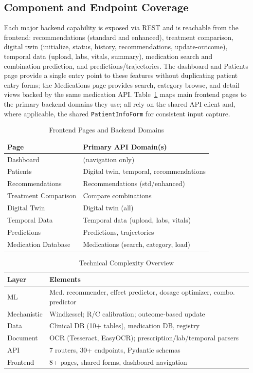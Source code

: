\documentclass[conference]{IEEEtran}
\begin{document}
\subsection{Component and Endpoint Coverage}
Each major backend capability is exposed via REST and is reachable from the frontend: recommendations (standard and enhanced), treatment comparison, digital twin (initialize, status, history, recommendations, update-outcome), temporal data (upload, labs, vitals, summary), medication search and combination prediction, and predictions/trajectories. The dashboard and Patients page provide a single entry point to these features without duplicating patient entry forms; the Medications page provides search, category browse, and detail views backed by the same medication API. Table~\ref{tab:frontend} maps main frontend pages to the primary backend domains they use; all rely on the shared API client and, where applicable, the shared \texttt{PatientInfoForm} for consistent input capture.

\begin{table}[t]
\caption{Frontend Pages and Backend Domains}
\label{tab:frontend}
\centering
\footnotesize
\begin{tabular}{@{}p{}p{}@{}}
\toprule
\textbf{Page} & \textbf{Primary API Domain(s)} \\
\midrule
Dashboard & (navigation only) \\
Patients & Digital twin, temporal, recommendations \\
Recommendations & Recommendations (std/enhanced) \\
Treatment Comparison & Compare combinations \\
Digital Twin & Digital twin (all) \\
Temporal Data & Temporal data (upload, labs, vitals) \\
Predictions & Predictions, trajectories \\
Medication Database & Medications (search, category, load) \\
\bottomrule
\end{tabular}
\end{table}

\begin{table}[t]
\caption{Technical Complexity Overview}
\label{tab:complexity}
\centering
\footnotesize
\begin{tabular}{@{}p{}p{}@{}}
\toprule
\textbf{Layer} & \textbf{Elements} \\
\midrule
ML & Med. recommender, effect predictor, dosage optimizer, combo. predictor \\
Mechanistic & Windkessel; R/C calibration; outcome-based update \\
Data & Clinical DB (10+ tables), medication DB, registry \\
Document & OCR (Tesseract, EasyOCR); prescription/lab/temporal parsers \\
API & 7 routers, 30+ endpoints, Pydantic schemas \\
Frontend & 8+ pages, shared forms, dashboard navigation \\
\bottomrule
\end{tabular}
\end{table}
\end{document}

